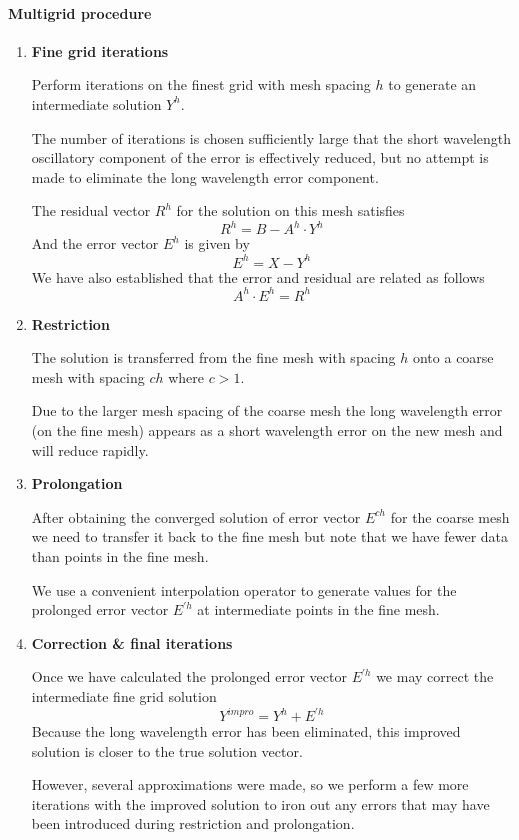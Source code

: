 \documentclass[a4paper, 15pt]{article}
\begin{document}
\paragraph*{Multigrid procedure} 
\begin{enumerate}
	\item \textbf{Fine grid iterations} 
	
	Perform
	iterations on the finest grid with mesh spacing $h$ to generate an intermediate solution $Y^h$. \newline 
	
	The
	number of iterations is chosen sufficiently large that the short wavelength oscillatory
	component of the error is effectively reduced, but no attempt is made to eliminate the long
	wavelength error component. \newline 
	
	The
	residual vector $R^h$ for the solution on this mesh satisfies 
	\[R^h = B-A^h\cdot Y^h\]
	And the error vector $E^h$
	is given by 
	\[E^h = X-Y^h\]
	We
	have also established that the error and residual are related as follows 
	\[A^h\cdot E^h = R^h\]
	
	
	\item \textbf{Restriction}
	
	The
	solution is transferred from the fine mesh with spacing $h$ onto a coarse mesh with spacing
	$ch$ where $c>1$. 
	
	Due
	to the larger mesh spacing of the coarse mesh the long wavelength error (on the fine mesh)
	appears as a short wavelength error on the new mesh and will reduce rapidly. 
	
	
	\item \textbf{Prolongation}
	
	After
	obtaining the converged solution of error vector $E^{ch}$ for the coarse mesh we need to
	transfer it back to the fine mesh but note that we have fewer data than points in the fine mesh. \newline 
	
	We
	use a convenient interpolation operator to generate values for the
	prolonged error vector $E^{'h}$ at intermediate points in the fine mesh. 
	
	\item \textbf{Correction \& final iterations}
	
	Once
	we have calculated the prolonged error vector $E^{'h}$ we may correct the intermediate fine
	grid solution
	\[Y^{impro} = Y^h+E^{'h}\]
	Because
	the long wavelength error has been eliminated, this improved solution is closer to the
	true solution vector. \newline 
	
	However,
	several approximations were made, so we perform a few more iterations with the
	improved solution to iron out any errors that may have been introduced during restriction and
	prolongation. 
\end{enumerate}
\end{document}
